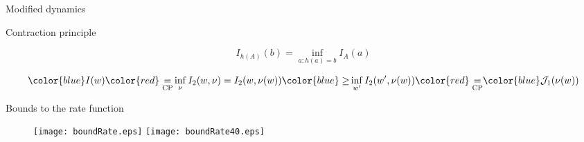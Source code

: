 \documentclass{beamer}
\begin{document}
{\begin{frame}[noframenumbering]{Modified dynamics}
\end{frame}

\begin{frame}[noframenumbering]{Contraction principle}

\begin{equation}
I_{h(A)}(b) = \inf_{a:h(a)=b} I_A(a)
\end{equation}



\return
\begin{equation}
{\color{blue} I(w)} {\color{red} \underset{\rm CP}{=}} \inf_{\nu} I_2(w, \nu) = I_2(w, \nu(w)) {\color{blue}\geq} \inf_{w^{\prime}} I_2(w^{\prime}, \nu(w)) {\color{red} \underset{\rm CP}{=}} {\color{blue} \mathcal{J}_1(\nu(w))}
\end{equation}

\end{frame}

\begin{frame}[noframenumbering]{Bounds to the rate function}

\begin{figure}
\texttt{[image: boundRate.eps]}
\texttt{[image: boundRate40.eps]}
\end{figure}


\end{frame}}
\end{document}

